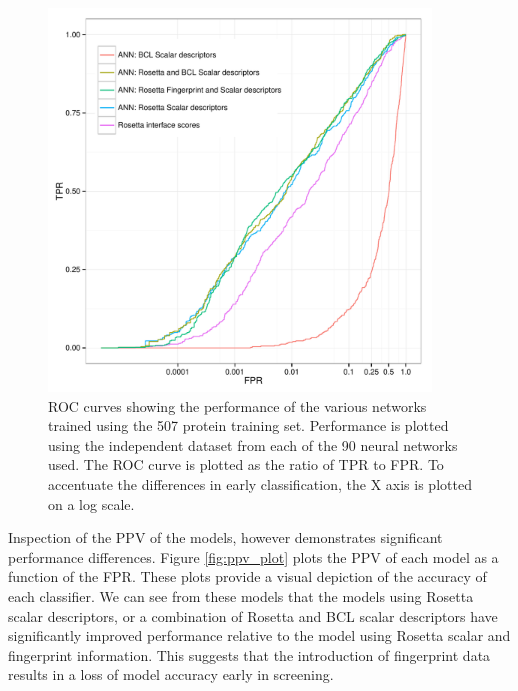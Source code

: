 \begin{figure}
\centering
\includegraphics[width=4in]{figures/hts/tpr_plot.pdf}
\caption{
\acs{ROC} curves showing the performance of the various networks trained using the 507 protein training set.
Performance is plotted using the independent dataset from each of the 90 neural networks used.
The \acs{ROC} curve is plotted as the ratio of \acs{TPR} to \acs{FPR}.
To accentuate the differences in early classification, the X axis is plotted on a log scale.
}
\label{fig:roc_plot}
\end{figure}
\begin{table}
\scriptsize
\renewcommand{\tabcolsep}{0.09cm}
\centering

\caption{
\acs{ROC-AUC} and average enrichment for the classification models being evaluated.
The Rosetta Interface Scores classifier uses only the sorted RosettaLigand interface scores for classification.
all "\acs{ANN}" classifiers are neural nets using the specified descriptors.
\acs{ROC-AUC} is the area under the \acs{ROC} curve generated from each descriptor (Figure \ref{fig:roc_plot})
Average enrichment is the average enrichment within the first 1\% of the each dataset.
}
\label{table:ann_performance}
\end{table}

Inspection of the \ac{PPV} of the models, however demonstrates significant performance differences.
Figure \ref{fig:ppv_plot} plots the \ac{PPV} of each model as a function of the \ac{FPR}.
These plots provide a visual depiction of the accuracy of each classifier.
We can see from these models that the models using Rosetta scalar descriptors, or a combination of Rosetta and \ac{BCL} scalar descriptors have significantly improved performance relative to the model using Rosetta scalar and fingerprint information.
This suggests that the introduction of fingerprint data results in a loss of model accuracy early in screening.

